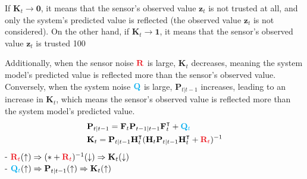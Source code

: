 \documentclass[10pt]{article}
\begin{document}
	If $\mathbf{K}_t \rightarrow \mathbf{0}$, it means that the sensor's observed value $\mathbf{z}_t$ is not trusted at all, and only the system's predicted value is reflected (the observed value $\mathbf{z}_t$ is not considered). On the other hand, if $\mathbf{K}_t \rightarrow \mathbf{1}$, it means that the sensor's observed value $\mathbf{z}_t$ is trusted 100%
	
	Additionally, when the sensor noise ${\color{Red}\mathbf{R}}$ is large, $\mathbf{K}_t$ decreases, meaning the system model's predicted value is reflected more than the sensor's observed value. Conversely, when the system noise ${\color{Cyan} \mathbf{Q}}$ is large, $\mathbf{P}_{t|t-1}$ increases, leading to an increase in $\mathbf{K}_t$, which means the sensor's observed value is reflected more than the system model's predicted value.
	\begin{equation}
		\begin{aligned}
			& \mathbf{P}_{t|t-1} = \mathbf{F}_{t}\mathbf{P}_{t-1|t-1}\mathbf{F}_{t}^{\intercal} + {\color{Cyan} \mathbf{Q}_{t}} \\
			& \mathbf{K}_{t} = \mathbf{P}_{t|t-1}\mathbf{H}_{t}^{\intercal}(\mathbf{H}_{t}\mathbf{P}_{t|t-1}\mathbf{H}_{t}^{\intercal} + {\color{Red} \mathbf{R}_{t}})^{-1}  \\
		\end{aligned}
	\end{equation}
	- ${\color{Red}\mathbf{R}_{t}}(\uparrow) \Rightarrow (\ast + {\color{Red}\mathbf{R}_{t}})^{-1}(\downarrow)  \Rightarrow \mathbf{K}_{t}(\downarrow)$  \\
	- ${\color{Cyan}\mathbf{Q}_{t}}(\uparrow) \Rightarrow \mathbf{P}_{t|t-1}(\uparrow)  \Rightarrow \mathbf{K}_{t}(\uparrow)$  \\
	
	
	
	
\end{document}
